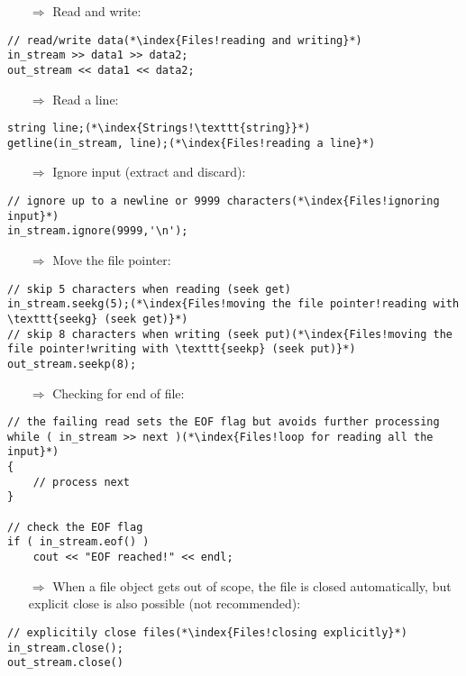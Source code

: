 \documentclass[10pt]{article}
\begin{document}
\begin{enumerate}
\item[$\Rightarrow$] Read and write:
\end{enumerate}
\begin{lstlisting}
// read/write data(*\index{Files!reading and writing}*)
in_stream >> data1 >> data2;
out_stream << data1 << data2;
\end{lstlisting}
\begin{enumerate}
\item[$\Rightarrow$] Read a line:
\end{enumerate}
\begin{lstlisting}
string line;(*\index{Strings!\texttt{string}}*)
getline(in_stream, line);(*\index{Files!reading a line}*)
\end{lstlisting}
\begin{enumerate}
\item[$\Rightarrow$] Ignore input (extract and discard):
\end{enumerate}
\begin{lstlisting}
// ignore up to a newline or 9999 characters(*\index{Files!ignoring input}*)
in_stream.ignore(9999,'\n');
\end{lstlisting}
\begin{enumerate}
\item[$\Rightarrow$] Move the file pointer:
\end{enumerate}
\begin{lstlisting}
// skip 5 characters when reading (seek get)
in_stream.seekg(5);(*\index{Files!moving the file pointer!reading with \texttt{seekg} (seek get)}*)
// skip 8 characters when writing (seek put)(*\index{Files!moving the file pointer!writing with \texttt{seekp} (seek put)}*)
out_stream.seekp(8);
\end{lstlisting}
\begin{enumerate}
\item[$\Rightarrow$] Checking for end of file:
\end{enumerate}
\begin{lstlisting}
// the failing read sets the EOF flag but avoids further processing
while ( in_stream >> next )(*\index{Files!loop for reading all the input}*)
{
    // process next
}

// check the EOF flag
if ( in_stream.eof() )
    cout << "EOF reached!" << endl;
\end{lstlisting}
\begin{enumerate}
\item[$\Rightarrow$] When a file object gets out of scope, the file is closed automatically, but explicit
close is also possible (not recommended):
\end{enumerate}
\begin{lstlisting}
// explicitily close files(*\index{Files!closing explicitly}*)
in_stream.close();
out_stream.close()
\end{lstlisting}
%
%
\end{document}
